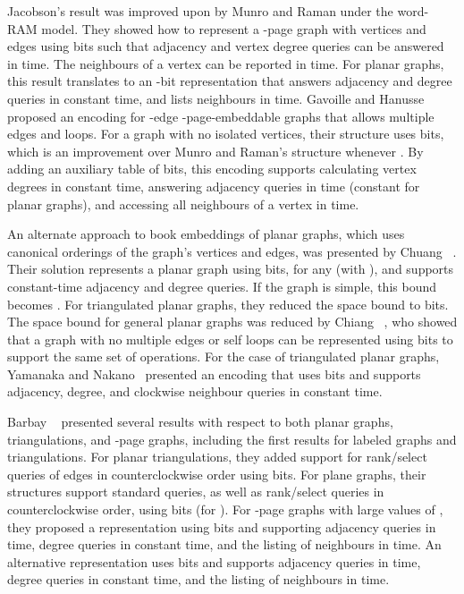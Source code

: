 Jacobson's result was improved upon by Munro and Raman
\cite{DBLP:conf/focs/MunroR97} under the word-RAM model.
They showed how to represent a -page graph with  vertices and  edges
using  bits such that adjacency and
vertex degree queries can be answered in  time.
The neighbours of a vertex  can be reported in  time.
For planar graphs, this result translates to an -bit
representation that answers adjacency and degree queries in constant
time, and lists neighbours in  time.
Gavoille and Hanusse \cite{DBLP:journals/dmtcs/GavoilleH08} proposed an encoding
for -edge -page-embeddable graphs that allows multiple edges and
loops.
For a graph with no isolated vertices, their structure uses  bits, which is an improvement over Munro and Raman's
structure whenever .
By adding an auxiliary table of  bits, this encoding
supports calculating vertex degrees in constant time, answering adjacency
queries in  time (constant for planar graphs), and
accessing all neighbours of a vertex in  time.

An alternate approach to book embeddings of planar graphs, which uses
canonical orderings of the graph's vertices and edges, was presented
by Chuang \etal~\cite{chuang_et_al_1998}.
Their solution represents a planar graph using
 bits, for any  
(with ), and supports constant-time adjacency 
and degree queries.
If the graph is simple, this bound becomes
.
For triangulated planar graphs, they reduced the space
bound to  bits.
The space bound for general planar graphs was reduced by Chiang
\etal~\cite{DBLP:journals/siamcomp/ChiangLL05}, who showed that a
graph with no multiple edges or self loops can be represented using
 bits to support the same set of
operations.
For the case of triangulated planar graphs, Yamanaka and
Nakano~\cite{DBLP:conf/walcom/YamanakaN08} presented an encoding that
uses  bits and supports adjacency, degree, and
clockwise neighbour queries in constant time.

Barbay \etal~\cite{DBLP:conf/isaac/BarbayAHM07} presented several
results with respect to both planar graphs, triangulations, and
-page graphs, including the first results for labeled graphs and
triangulations.
For planar triangulations, they added support for
rank/select queries of edges in counterclockwise order using  bits.
For plane graphs, their structures support
standard queries, as well as rank/select queries in counterclockwise
order, using 
bits (for ).
For -page graphs
with large values of , they proposed a representation using  bits and supporting
adjacency queries in  time, degree queries in
constant time, and the listing of neighbours in  time.
An alternative representation uses
 bits and
supports adjacency queries in  time, degree queries in
constant time, and the listing of neighbours in  time.

